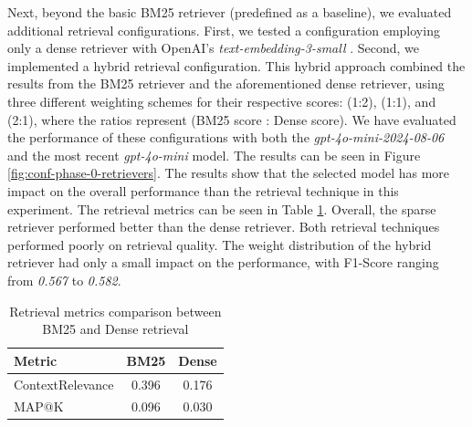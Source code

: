   Next, beyond the basic BM25 retriever (predefined as a baseline), we evaluated additional retrieval configurations. First, we tested a configuration employing only a dense retriever with OpenAI's \textit{text-embedding-3-small} \cite{OpenAI_2022}. Second, we implemented a hybrid retrieval configuration. This hybrid approach combined the results from the BM25 retriever and the aforementioned dense retriever, using three different weighting schemes for their respective scores: (1:2), (1:1), and (2:1), where the ratios represent (BM25 score : Dense score). We have evaluated the performance of these configurations with both the \textit{gpt-4o-mini-2024-08-06} and the most recent \textit{gpt-4o-mini} model. The results can be seen in Figure \ref{fig:conf-phase-0-retrievers}. The results show that the selected model has more impact on the overall performance than the retrieval technique in this experiment. The retrieval metrics can be seen in Table \ref{tab:retrieval_metrics}. Overall, the sparse retriever performed better than the dense retriever. Both retrieval techniques performed poorly on retrieval quality. The weight distribution of the hybrid retriever had only a small impact on the performance, with F1-Score ranging from \textit{0.567} to \textit{0.582}.

\begin{table}[h]
    \centering
    \begin{tabular}{|l|c|c|}
        \hline
        \textbf{Metric} & \textbf{BM25} & \textbf{Dense} \\
        \hline
        ContextRelevance & 0.396 & 0.176 \\
        MAP@K & 0.096 & 0.030 \\
        \hline
    \end{tabular}
    \caption{Retrieval metrics comparison between BM25 and Dense retrieval}
    \label{tab:retrieval_metrics}
\end{table}

